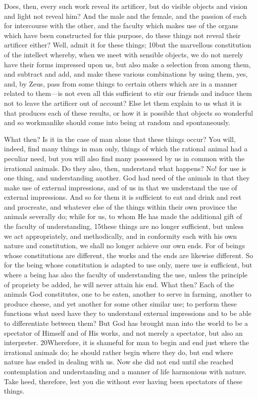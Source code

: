 Does, then, every such work reveal its artificer, but do visible objects and vision and light not reveal him? And the male and the female, and the passion of each for intercourse with the other, and the faculty which makes use of the organs which have been constructed for this purpose, do these things not reveal their artificer either? Well, admit it for these things; 10but the marvellous constitution of the intellect whereby, when we meet with sensible objects, we do not merely have their forms impressed upon us, but also make a selection from among them, and subtract and add, and make these various combinations by using them, yes, and, by Zeus, pass from some things to certain others which are in a manner related to them—is not even all this sufficient to stir our friends and induce them not to leave the artificer out of account? Else let them explain to us what it is that produces each of these results, or how it is possible that objects so wonderful and so workmanlike should come into being at random and spontaneously.

What then? Is it in the case of man alone that these things occur? You will, indeed, find many things in man only, things of which the rational animal had a peculiar need, but you will also find many possessed by us in common with the irrational animals. Do they also, then, understand what happens? No! for use is one thing, and understanding another. God had need of the animals in that they make use of external impressions, and of us in that we understand the use of external impressions. And so for them it is sufficient to eat and drink and rest and procreate, and whatever else of the things within their own province the animals severally do; while for us, to whom He has made the additional gift of the faculty of understanding, 15these things are no longer sufficient, but unless we act appropriately, and methodically, and in conformity each with his own nature and constitution, we shall no longer achieve our own ends. For of beings whose constitutions are different, the works and the ends are likewise different. So for the being whose constitution is adapted to use only, mere use is sufficient, but where a being has also the faculty of understanding the use, unless the principle of propriety be added, he will never attain his end. What then? Each of the animals God constitutes, one to be eaten, another to serve in farming, another to produce cheese, and yet another for some other similar use; to perform these functions what need have they to understand external impressions and to be able to differentiate between them? But God has brought man into the world to be a spectator of Himself and of His works, and not merely a spectator, but also an interpreter. 20Wherefore, it is shameful for man to begin and end just where the irrational animals do; he should rather begin where they do, but end where nature has ended in dealing with us. Now she did not end until she reached contemplation and understanding and a manner of life harmonious with nature. Take heed, therefore, lest you die without ever having been spectators of these things.

